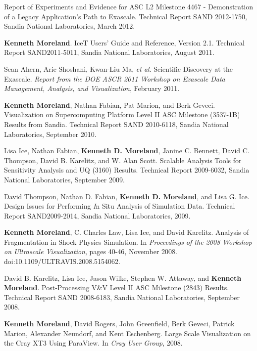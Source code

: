 \begin{enumerate}[label={[\arabic*]}, left=0pt]
  Report of Experiments and Evidence for ASC L2 Milestone 4467 - Demonstration of a Legacy Application’s Path to Exascale.
Technical Report SAND 2012-1750, Sandia National Laboratories, March 2012.
\item  %
  \textbf{Kenneth Moreland}.
  {IceT} Users' Guide and Reference, Version 2.1.
Technical Report SAND2011-5011, Sandia National Laboratories, August 2011.
\item  %
  Sean Ahern, Arie Shoshani, Kwan-Liu Ma, \emph{et al}.
  Scientific Discovery at the Exascale.
\emph{Report from the DOE ASCR 2011 Workshop on Exascale Data Management, Analysis, and Visualization}, February 2011.
\item  %
  \textbf{Kenneth Moreland}, Nathan Fabian, Pat Marion, and Berk Geveci.
  Visualization on Supercomputing Platform Level {II} {ASC} Milestone {(3537-1B)} Results from {Sandia}.
Technical Report SAND 2010-6118, Sandia National Laboratories, September 2010.
\item  %
  Lisa Ice, Nathan Fabian, \textbf{Kenneth D. Moreland}, Janine C. Bennett, David C. Thompson, David B. Karelitz, and W. Alan Scott.
  Scalable Analysis Tools for Sensitivity Analysis and {UQ} (3160) Results.
Technical Report 2009-6032, Sandia National Laboratories, September 2009.
\item  %
  David Thompson, Nathan D. Fabian, \textbf{Kenneth D. Moreland}, and Lisa G. Ice.
  Design Issues for Performing {\textit In Situ} Analysis of Simulation Data.
Technical Report SAND2009-2014, Sandia National Laboratories, 2009.
\item  %
  \textbf{Kenneth Moreland}, C. Charles Law, Lisa Ice, and David Karelitz.
  Analysis of Fragmentation in Shock Physics Simulation.
  In \emph{Proceedings of the 2008 Workshop on Ultrascale Visualization}, pages 40-46, November 2008.
  doi:10.1109/ULTRAVIS.2008.5154062.
\item  %
  David B. Karelitz, Lisa Ice, Jason Wilke, Stephen W. Attaway, and \textbf{Kenneth Moreland}.
  Post-Processing {V\&V} Level {II} {ASC} Milestone (2843) Results.
Technical Report SAND 2008-6183, Sandia National Laboratories, September 2008.
\item  %
  \textbf{Kenneth Moreland}, David Rogers, John Greenfield, Berk Geveci, Patrick Marion, Alexander Neundorf, and Kent Eschenberg.
  Large Scale Visualization on the {Cray XT3} Using ParaView.
  In \emph{Cray User Group}, 2008.
\item  %

\end{enumerate}
